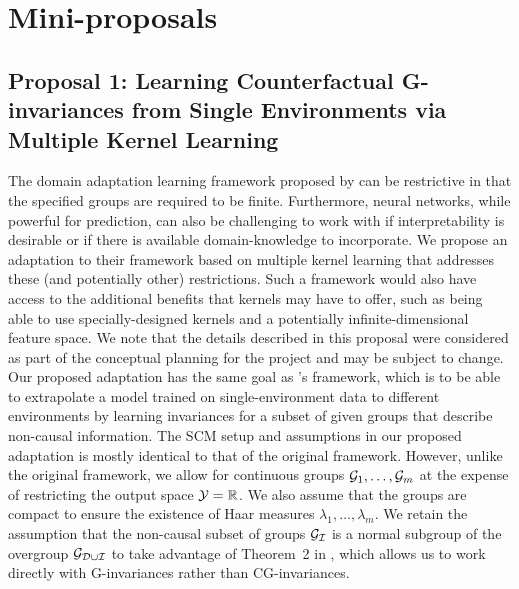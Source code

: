 

\section{Mini-proposals}

\subsection{Proposal 1: Learning Counterfactual G-invariances from Single Environments via Multiple Kernel Learning}

The domain adaptation learning framework proposed by \textcite{Mouli:2021} can be restrictive in that the specified groups are required to be finite. Furthermore, neural networks, while powerful for prediction, can also be challenging to work with if interpretability is desirable or if there is available domain-knowledge to incorporate. We propose an adaptation to their framework based on multiple kernel learning \parencite{Gonen:2011} that addresses these (and potentially other) restrictions. Such a framework would also have access to the additional benefits that kernels may have to offer, such as being able to use specially-designed kernels and a potentially infinite-dimensional feature space. We note that the details described in this proposal were considered as part of the conceptual planning for the project and may be subject to change.
\\

Our proposed adaptation has the same goal as \citeauthor{Mouli:2021}'s framework, which is to be able to extrapolate a model trained on single-environment data to different environments by learning invariances for a subset of given groups that describe non-causal information. The SCM setup and assumptions in our proposed adaptation is mostly identical to that of the original framework. However, unlike the original framework, we allow for continuous groups $\mathcal{G}_1,\ldots,\mathcal{G}_m$ at the expense of restricting the output space $\mathcal{Y}=\mathbb{R}$. We also assume that the groups are compact to ensure the existence of Haar measures $\lambda_1,\ldots,\lambda_m$. We retain the assumption that the non-causal subset of groups $\mathcal{G}_{\mathcal{I}}$ is a normal subgroup of the overgroup $\mathcal{G}_{\mathcal{D}\cup\mathcal{I}}$ to take advantage of Theorem~2 in \parencite{Mouli:2021}, which allows us to work directly with G-invariances rather than CG-invariances.
\\

